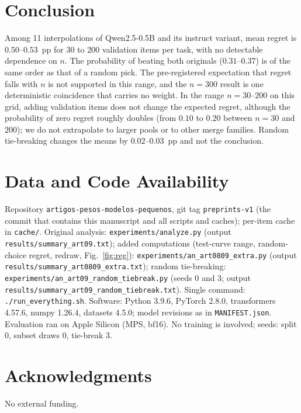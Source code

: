 \documentclass[conference]{IEEEtran}
\begin{document}
\section{Conclusion}
Among 11 interpolations of Qwen2.5-0.5B and its instruct variant, mean regret is $0.50$--$0.53$~pp for $30$ to $200$ validation items per task, with no detectable dependence on $n$. The probability of beating both originals ($0.31$--$0.37$) is of the same order as that of a random pick. The pre-registered expectation that regret falls with $n$ is not supported in this range, and the $n=300$ result is one deterministic coincidence that carries no weight. In the range $n=30$--$200$ on this grid, adding validation items does not change the expected regret, although the probability of zero regret roughly doubles (from $0.10$ to $0.20$ between $n=30$ and $200$); we do not extrapolate to larger pools or to other merge families. Random tie-breaking changes the means by $0.02$--$0.03$~pp and not the conclusion.

\section*{Data and Code Availability}
Repository \texttt{artigos-pesos-modelos-pequenos}, git tag \texttt{preprints-v1} (the commit that contains this manuscript and all scripts and caches); per-item cache in \texttt{cache/}. Original analysis: \texttt{experiments/analyze.py} (output \texttt{results/summary\_art09.txt}); added computations (test-curve range, random-choice regret, redraw, Fig.~\ref{fig:reg}): \texttt{experiments/an\_art0809\_extra.py} (output \texttt{results/summary\_art0809\_extra.txt}); random tie-breaking: \texttt{experiments/an\_art09\_random\_tiebreak.py} (seeds 0 and 3; output \texttt{results/summary\_art09\_random\_tiebreak.txt}). Single command: \texttt{./run\_everything.sh}. Software: Python 3.9.6, PyTorch 2.8.0, transformers 4.57.6, numpy 1.26.4, datasets 4.5.0; model revisions as in \texttt{MANIFEST.json}. Evaluation ran on Apple Silicon (MPS, bf16). No training is involved; seeds: split 0, subset draws 0, tie-break 3.

\section*{Acknowledgments}
No external funding.
\end{document}

